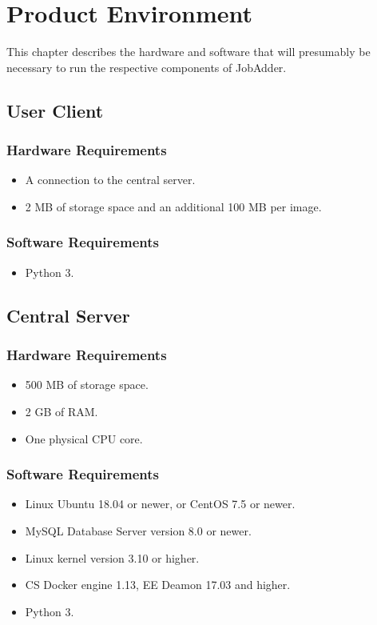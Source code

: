 \chapter{Product Environment}
  This chapter describes the hardware and software that will presumably be necessary to run the respective components of JobAdder.
  \section{User Client}
    \subsection{Hardware Requirements}
      \begin{itemize}
      \item A connection to the central server.
      \item 2 MB of storage space and an additional 100 MB per image.
      \end{itemize}
    \subsection{Software Requirements}
      \begin{itemize}
      \item Python 3.
    \end{itemize}

  \section{Central Server}
    \subsection{Hardware Requirements}
    \begin{itemize}
      \item 500 MB of storage space.
      \item 2 GB of RAM.
      \item One physical CPU core.
    \end{itemize}
    \subsection{Software Requirements}
    \begin{itemize}
      \item Linux Ubuntu 18.04 or newer, or CentOS 7.5 or newer.
      \item MySQL Database Server version 8.0 or newer.
      \item Linux kernel version 3.10 or higher.
      \item CS Docker engine 1.13, EE Deamon 17.03 and higher.
      \item Python 3.
    \end{itemize}

